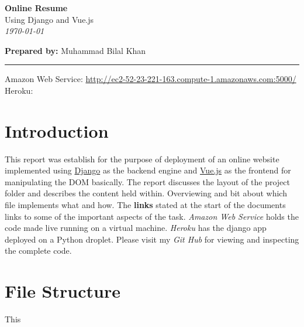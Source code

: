 \documentclass[11pt]{article}
\begin{document}

\begin{flushright}
	\Huge{\textbf{Online Resume}} \\
	\Large{Using Django and Vue.js} \\
	\emph{\large{\today}} \\
\end{flushright}

\begin{flushleft}
	\large{\textbf{Prepared by: } Muhammad Bilal Khan} \\
\end{flushleft}

\vspace{-0.8cm}

\begin{center}
	{\rule{475pt}{1pt}}
\end{center}
	
\begin{center}
	Amazon Web Service: \href{http://ec2-52-23-221-163.compute-1.amazonaws.com:5000/}{http://ec2-52-23-221-163.compute-1.amazonaws.com:5000/} \\
	Heroku: \\
\end{center}

\section{Introduction}
This report was establish for the purpose of deployment of an online website implemented using \href{https://www.djangoproject.com/}{Django} as the backend engine and \href{https://vuejs.org/}{Vue.js} as the frontend for manipulating the DOM basically.
The report discusses the layout of the project folder and describes the content held within.
Overviewing and bit about which file implements what and how.
The \textbf{links} stated at the start of the documents links to some of the important aspects of the task.
\textit{Amazon Web Service} holds the code made live running on a virtual machine.
\textit{Heroku} has the django app deployed on a Python droplet.
Please visit my \textit{Git Hub} for viewing and inspecting the complete code.

\section{File Structure}
This 
\end{document}
